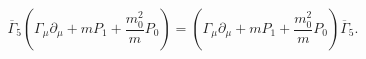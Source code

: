 \begin{equation}
\overline{\Gamma }_5\left( \Gamma _\mu
\partial_\mu +mP_1 +\frac{m_0^2}{m}P_0\right)=\left( \Gamma _\mu
\partial_\mu +mP_1 +\frac{m_0^2}{m}P_0\right)\overline{\Gamma }_5
. \label{52}
\end{equation}

